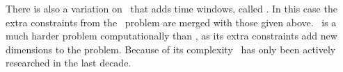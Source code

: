 There is also a variation on \PDP\ that adds time windows, called \PDPTW. In this case the extra constraints from the \VRPTW\ problem are merged with those given above. \PDP\ is a much harder problem computationally than \CVRP, as its extra constraints add new dimensions to the problem. Because of its complexity \PDP\ has only been actively researched in the last decade. 


